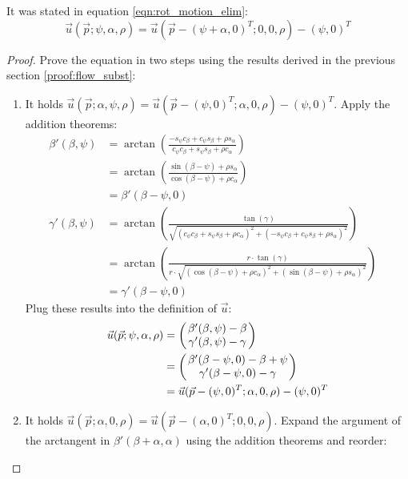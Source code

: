 It was stated in equation \ref{eqn:rot_motion_elim}:
  $$\vec u(\vec p; \psi, \alpha, \rho) = \vec u(\vec p - (\psi + \alpha, 0)^T; 0, 0, \rho) - (\psi, 0)^T$$

\begin{proof}
Prove the equation in two steps using the results derived in the previous section \ref{proof:flow_subst}:
\begin{enumerate}[1.]
 \item It holds $\vec u(\vec p; \alpha, \psi, \rho) = \vec u(\vec p - (\psi, 0)^T; \alpha, 0, \rho) - (\psi, 0)^T$. Apply the addition theorems:
 \begin{align*}
\beta'(\beta, \psi) &= \arctan
    \left(
      \frac{
	  -s_{\psi} c_\beta + c_{\psi} s_\beta + \rho s_{\alpha}
      }{
          c_{\psi} c_\beta + s_{\psi} s_\beta + \rho c_{\alpha}
      }
    \right) & \\
    &= \arctan\left(
      \frac{
	  \sin(\beta - \psi) + \rho s_{\alpha}
      }{
          \cos(\beta - \psi) + \rho c_{\alpha}
      }
    \right) \\
    &= \beta'(\beta - \psi, 0) \\
\gamma'(\beta, \psi) &= \arctan
    \left(
      \frac{
	\tan(\gamma)
      }{
	\sqrt{
	  (  c_{\psi} c_\beta + s_{\psi} s_\beta + \rho c_{\alpha})^{2} +
	  (- s_{\psi} c_\beta + c_{\psi} s_\beta + \rho s_{\alpha})^{2}}
      }
    \right) \\
    &= \arctan
    \left(
      \frac{
	r \cdot \tan(\gamma)
      }{
	r \cdot \sqrt{
	  (  \cos(\beta - \psi) + \rho c_{\alpha} )^{2} +
	  (  \sin(\beta - \psi) + \rho s_{\alpha})^{2}}
      }
    \right)\\
    &= \gamma'(\beta - \psi, 0)
\end{align*}
Plug these results into the definition of $\vec u$:
\begin{align}
\begin{aligned}
  \vec u(\vec p; \psi, \alpha, \rho) &=
  \begmat
    \beta'(\beta, \psi) - \beta \\
    \gamma'(\beta, \psi) - \gamma
  \finmat \\
  &= \begmat
    \beta'(\beta - \psi, 0) - \beta + \psi \\
    \gamma'(\beta - \psi, 0) - \gamma \\
  \finmat \\
  &= \vec u(\vec p - (\psi, 0)^T; \alpha, 0, \rho) - (\psi, 0)^T
\end{aligned}
\label{eqn:flow_prf1}
\end{align}
  \item It holds $\vec u(\vec p; \alpha, 0, \rho) = \vec u(\vec p - (\alpha, 0)^T; 0, 0, \rho)$. Expand the argument of the arctangent in $\beta'(\beta + \alpha, \alpha)$ using the addition theorems and reorder:

\end{enumerate}
\end{proof}
